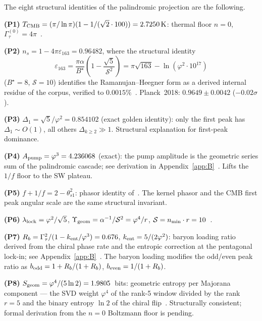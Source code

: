 \documentclass[twocolumn,10pt]{article}
\newcommand{\vp}{\varphi}
\newcommand{\Gt}{\Gamma_\tau}
\newcommand{\Sgeom}{S_{\rm geom}}
\newcommand{\llock}{\lambda_{\rm lock}}
\begin{document}
The eight structural identities of the palindromic projection are
the following.

\smallskip
\noindent\textbf{(P1)} $T_{\rm CMB}=(\pi/\ln\pi)(1-1/(\sqrt{2}\cdot100))
=2.7250\,\mathrm{K}$: thermal floor $n=0$, $\Gt^{(0)}=4\pi$~\cite{CamP13}.

\noindent\textbf{(P2)} $n_s=1-4\pi\varepsilon_{163}=0.96482$, where
the structural identity
\begin{equation*}
  \varepsilon_{163}
  = \frac{\pi\alpha}{B^\star}\!\left(1-\frac{\sqrt{5}}{\mathcal{S}^2}\right)
  = \pi\sqrt{163}-\ln(\vp^2\cdot10^{17})
\end{equation*}
($B^\star=8$, $\mathcal{S}=10$) identifies the Ramanujan--Heegner
form as a derived internal residue of the corpus, verified to
$0.0015\%$~\cite{CamKer163}.
Planck~2018: $0.9649\pm0.0042$ ($-0.02\sigma$).

\noindent\textbf{(P3)} $\Delta_1=\sqrt{5}/\vp^2=0.854102$ (exact golden
identity): only the first peak has $\Delta_1\sim O(1)$, all others
$\Delta_{k\geq2}\gg1$. Structural explanation for first-peak dominance.

\noindent\textbf{(P4)} $A_{\rm pump}=\vp^3=4.236068$ (exact): the
pump amplitude is the geometric series sum of the palindromic
cascade; see derivation in Appendix~\ref{app:B}~\cite{CamP12}.
Lifts the $1/f$ floor to the SW plateau.

\noindent\textbf{(P5)} $f+1/f=2-\theta_{s1}^2$: phasor identity
of~\cite{CamKer163}. The kernel phasor and the CMB first
peak angular scale are the same structural invariant.

\noindent\textbf{(P6)} $\llock=\vp^2/\sqrt{5}$,
$\Upsilon_{\rm geom}=\alpha^{-1}/\mathcal{S}^2=\vp^4/r$,
$\mathcal{S}=n_{\rm min}\cdot r=10$~\cite{CamKer163}.

\noindent\textbf{(P7)} $R_b=\Gt^2/(1-k_{\rm ent}/\vp^3)=0.676$,
$k_{\rm ent}=5/(2\vp^2)$: baryon loading ratio derived from the
chiral phase rate and the entropic correction at the pentagonal
lock-in; see Appendix~\ref{app:B}~\cite{CamP12}. The baryon loading
modifies the odd/even peak ratio as $b_{\rm odd}=1+R_b/(1+R_b)$,
$b_{\rm even}=1/(1+R_b)$.

\noindent\textbf{(P8)} $\Sgeom=\vp^4/(5\ln2)=1.9805$~bits: geometric
entropy per Majorana component — the SVD weight $\vp^4$ of the
rank-5 window divided by the rank $r=5$ and the binary entropy
$\ln 2$ of the chiral flip~\cite{CamKer163,CamP14}.
Structurally consistent; formal derivation from the $n=0$ Boltzmann
floor is pending.
\end{document}
